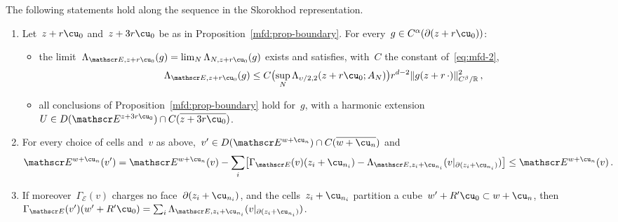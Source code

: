 \documentclass[11pt]{amsart}
\begin{document}
\begin{proposition}
\label{mfd:prop-gluing}
The following statements hold along the sequence in the Skorokhod representation.
\begin{enumerate}[label=(\roman*)]
\item Let~$z+r\cu_0$ and~$z+3r\cu_0$ be as in Proposition~\ref{mfd:prop-boundary}. For every~$g\in C^\alpha(\partial(z+r\cu_0))$:
\begin{itemize}
\item the limit~$\Lambda_{\mathscr E,z+r\cu_0}(g)=\lim_N\Lambda_{N,z+r\cu_0}(g)$ exists and satisfies, with~$C$ the constant of~\eqref{eq:mfd-2},
\begin{equation*}
	\Lambda_{\mathscr E,z+r\cu_0}(g)\leq C\bigl(\sup_N\Lambda_{\upsilon/2,2}(z+r\cu_0;A_N)\bigr)r^{d-2}\|g(z+r\,\cdot)\|_{C^\beta/\mathbb R}^2\,,
\end{equation*}
\item all conclusions of Proposition~\ref{mfd:prop-boundary} hold for~$g$, with a harmonic extension~$U\in D(\mathscr E^{z+3r\cu_0})\cap C(\overline{z+3r\cu_0})$.
\end{itemize}
\item For every choice of cells and~$v$ as above,~$v'\in D(\mathscr E^{w+\cu_n})\cap C(\overline{w+\cu_n})$ and
\begin{equation*}
	\mathscr E^{w+\cu_n}(v')=\mathscr E^{w+\cu_n}(v)-\sum_i\bigl[\Gamma_{\mathscr E}(v)(z_i+\cu_{n_i})-\Lambda_{\mathscr E,z_i+\cu_{n_i}}(v|_{\partial(z_i+\cu_{n_i})})\bigr]\leq \mathscr E^{w+\cu_n}(v)\,.
\end{equation*}
\item If moreover~$\Gamma_{\mathscr E}(v)$ charges no face~$\partial(z_i+\cu_{n_i})$, and the cells~$z_i+\cu_{n_i}$ partition a cube~$w'+R'\cu_0\subset w+\cu_n$, then~$\Gamma_{\mathscr E}(v')(w'+R'\cu_0)=\sum_i\Lambda_{\mathscr E,z_i+\cu_{n_i}}(v|_{\partial(z_i+\cu_{n_i})})$.
\end{enumerate}
\end{proposition}
\end{document}
